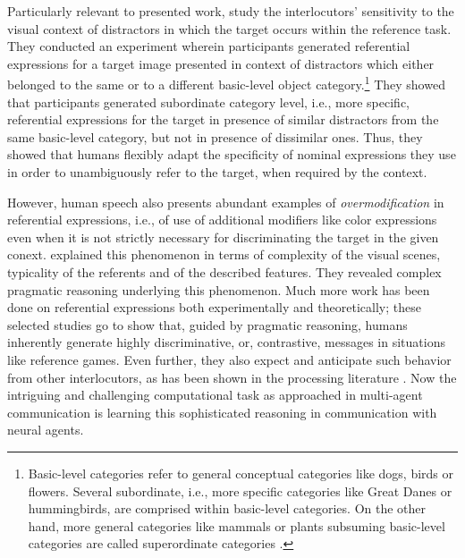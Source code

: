Particularly relevant to presented work, \cite{graf2016animal} study the interlocutors' sensitivity to the visual context of distractors in which the target occurs within the reference task. They conducted an experiment wherein participants generated referential expressions for a target image presented in context of distractors which either belonged to the same or to a different basic-level object category.\footnote{Basic-level categories refer to general conceptual categories like dogs, birds or flowers. Several subordinate, i.e., more specific categories like Great Danes or hummingbirds, are comprised within basic-level categories. On the other hand, more general categories like mammals or plants subsuming basic-level categories are called superordinate categories \parencite{rosch1976basic}.} They showed that participants generated subordinate category level, i.e., more specific, referential expressions for the target in presence of similar distractors from the same basic-level category, but not in presence of dissimilar ones. Thus, they showed that humans flexibly adapt the specificity of nominal expressions they use in order to unambiguously refer to the target, when required by the context. 

However, human speech also presents abundant examples of \textit{overmodification} in referential expressions, i.e., of use of additional modifiers like color expressions even when it is not strictly necessary for discriminating the target in the given conext. \cite{degen2020redundancy} explained this phenomenon in terms of complexity of the visual scenes, typicality of the referents and of the described features. They revealed complex pragmatic reasoning underlying this phenomenon. Much more work has been done on referential expressions both experimentally and theoretically; these selected studies go to show that, guided by pragmatic reasoning, humans inherently generate highly discriminative, or, contrastive, messages in situations like reference games. Even further, they also expect and anticipate such behavior from other interlocutors, as has been shown in the processing literature \parencite[e.~g.,~cf.][]{sedivy1999achieving}. Now the intriguing and challenging computational task as approached in multi-agent communication is learning this sophisticated reasoning in communication with neural agents.

